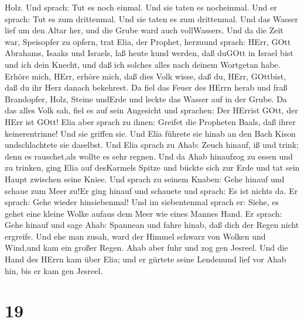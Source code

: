 Holz. Und sprach: Tut es noch einmal. Und sie taten es nocheinmal. Und
er sprach: Tut es zum drittenmal. Und sie taten es zum drittenmal.
 Und das Wasser lief um den Altar her, und die Grube ward
auch vollWassers.  Und da die Zeit war, Speisopfer zu
opfern, trat Elia, der Prophet, herzuund sprach: HErr, GOtt Abrahams,
Isaaks und Israels, laß heute kund werden, daß duGOtt in Israel bist und
ich dein Knecht, und daß ich solches alles nach deinem Wortgetan habe.
 Erhöre mich, HErr, erhöre mich, daß dies Volk wisse, daß
du, HErr, GOttbist, daß du ihr Herz danach bekehrest.  Da
fiel das Feuer des HErrn herab und fraß Brandopfer, Holz, Steine undErde
und leckte das Wasser auf in der Grube.  Da das alles Volk
sah, fiel es auf sein Angesicht und sprachen: Der HErrist GOtt, der HErr
ist GOtt!  Elia aber sprach zu ihnen: Greifet die Propheten
Baals, daß ihrer keinerentrinne! Und sie griffen sie. Und Elia führete
sie hinab an den Bach Kison undschlachtete sie daselbst. 
Und Elia sprach zu Ahab: Zeuch hinauf, iß und trink; denn es
rauschet,als wollte es sehr regnen.  Und da Ahab hinaufzog
zu essen und zu trinken, ging Elia auf desKarmels Spitze und bückte sich
zur Erde und tat sein Haupt zwischen seine Kniee.  Und
sprach zu seinem Knaben: Gehe hinauf und schaue zum Meer zu!Er ging
hinauf und schauete und sprach: Es ist nichts da. Er sprach: Gehe wieder
hinsiebenmal!  Und im siebentenmal sprach er: Siehe, es
gehet eine kleine Wolke aufaus dem Meer wie eines Mannes Hand. Er
sprach: Gehe hinauf und sage Ahab: Spannean und fahre hinab, daß dich
der Regen nicht ergreife.  Und ehe man zusah, ward der
Himmel schwarz von Wolken und Wind,und kam ein großer Regen. Ahab aber
fuhr und zog gen Jesreel.  Und die Hand des HErrn kam über
Elia; und er gürtete seine Lendenund lief vor Ahab hin, bis er kam gen
Jesreel.

\hypertarget{section-18}{%
\section{19}\label{section-18}}

